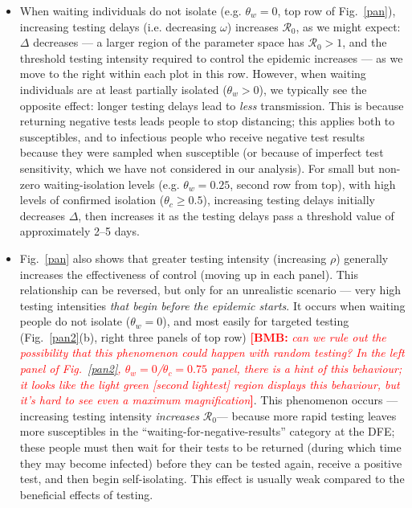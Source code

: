 \documentclass[12pt]{article}
\newcommand{\fref}[1]{Fig.~\ref{#1}}
\newcommand{\Rnum}{\ensuremath{\mathcal{R}_0}\xspace}
\DeclareRobustCommand\_{\ifmmode\expandafter\subtxt\else\textunderscore\fi}
\newcommand{\comment}{\showcomment}
\newcommand{\showcomment}[3]{\textcolor{#1}{\textbf{[#2: }\textsl{#3}\textbf{]}}}
\newcommand{\bmb}[1]{\comment{red}{BMB}{#1}}
\theoremstyle{definition} %
\begin{document}
\begin{itemize}
\item When waiting individuals do not isolate (e.g. $\theta_w =0$, top row of \fref{pan}), increasing testing delays (i.e. decreasing $\omega$) increases \Rnum, as we might expect: $\Delta$ decreases --- a larger region of the parameter space has $\Rnum>1$, and the threshold testing intensity required to control the epidemic increases --- as we move to the right within each plot in this row. However, when waiting individuals are at least partially isolated ($\theta_w>0$), we typically see the opposite effect: longer testing delays lead to \emph{less} transmission. This is because returning negative tests leads people to stop distancing; this applies both to susceptibles, and to infectious people who receive negative test results because they were sampled when susceptible (or because of imperfect test sensitivity, which we have not considered in our analysis). For small but non-zero waiting-isolation levels (e.g. $\theta_w=0.25$, second row from top), with high levels of confirmed isolation ($\theta_c \ge 0.5$), increasing testing delays initially decreases $\Delta$, then increases it as the testing delays pass a threshold value of approximately 2--5 days.
\item \fref{pan} also shows that greater testing intensity (increasing $\rho$) generally increases the effectiveness of control (moving up in each panel). This relationship can be reversed, but only for an unrealistic scenario --- very high testing intensities \emph{that begin before the epidemic starts}. It occurs when waiting people do not isolate ($\theta_w=0$), and most easily for targeted testing (\fref{pan2}(b), right three panels of top row) \bmb{can we rule out the possibility that this phenomenon could happen with random testing? In the left panel of \fref{pan2}, $\theta_w=0$/$\theta_c=0.75$ panel, there is a hint of this behaviour; it looks like the light green [second lightest] region displays this behaviour, but it's hard to see even a maximum magnification}. This phenomenon occurs --- increasing testing intensity \emph{increases} \Rnum --- because more rapid testing leaves more susceptibles in the ``waiting-for-negative-results'' category at the DFE; these people must then wait for their tests to be returned (during which time they may become infected) before they can be tested again, receive a positive test, and then begin self-isolating. This effect is usually weak compared to the beneficial effects of testing.

\end{itemize}
\end{document}
